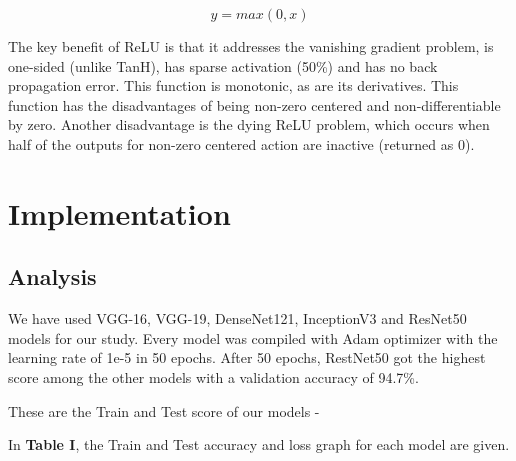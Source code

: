 \documentclass[conference]{IEEEtran}
\begin{document}
\vspace{5mm}
\begin{equation*}
y=max(0,x) 
\end{equation*}

\noindent The key benefit of ReLU is that it addresses the vanishing gradient problem, is one-sided (unlike TanH), has sparse activation (50\%) and has no back propagation error. This function is monotonic, as are its derivatives. This function has the disadvantages of being non-zero centered and non-differentiable by zero. Another disadvantage is the dying ReLU problem, which occurs when half of the outputs for non-zero centered action are inactive (returned as 0).

\vspace{5mm}
\section{Implementation}
\subsection{Analysis}
We have used VGG-16, VGG-19, DenseNet121, InceptionV3 and ResNet50 models for our study. Every model was compiled with Adam optimizer with the learning rate of 1e-5 in 50 epochs.
After 50 epochs, RestNet50 got the highest score among the other models with a validation accuracy of 94.7\%.

\noindent These are the Train and Test score of our models -

\noindent In \textbf{Table I}, the Train and Test accuracy and loss graph for each model are given.

\begin{table}[hbt!]
\caption{Model Accuracy and Loss}
\label{tab:Model Accuracy and Loss}
\end{table}
\end{document}
